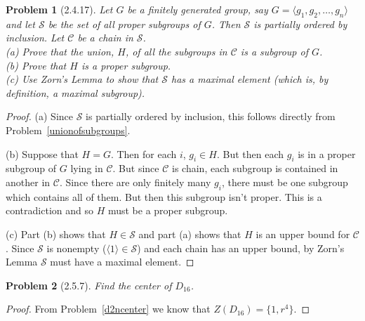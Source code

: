 \documentclass{article}
\newtheorem{problem}{Problem}
\begin{document}
\begin{problem}[2.4.17]
Let $G$ be a finitely generated group, say $G = \langle g_1, g_2, \dots , g_n \rangle$ and let $\mathcal{S}$ be the set of all proper subgroups of $G$. Then $\mathcal{S}$ is partially ordered by inclusion. Let $\mathcal{C}$ be a chain in $\mathcal{S}$.\\
(a) Prove that the union, $H$, of all the subgroups in $\mathcal{C}$ is a subgroup of $G$.\\
(b) Prove that $H$ is a \emph{proper} subgroup.\\
(c) Use Zorn's Lemma to show that $\mathcal{S}$ has a maximal element (which is, by definition, a maximal subgroup).
\end{problem}
\begin{proof}
(a) Since $\mathcal{S}$ is partially ordered by inclusion, this follows directly from Problem~\ref{unionofsubgroups}.

(b) Suppose that $H = G$. Then for each $i$, $g_i \in H$. But then each $g_i$ is in a proper subgroup of $G$ lying in $\mathcal{C}$. But since $\mathcal{C}$ is chain, each subgroup is contained in another in $\mathcal{C}$. Since there are only finitely many $g_i$, there must be one subgroup which contains all of them. But then this subgroup isn't proper. This is a contradiction and so $H$ must be a proper subgroup.

(c) Part (b) shows that $H \in \mathcal{S}$ and part (a) shows that $H$ is an upper bound for $\mathcal{C}$. Since $\mathcal{S}$ is nonempty ($\langle 1 \rangle \in \mathcal{S}$) and each chain has an upper bound, by Zorn's Lemma $\mathcal{S}$ must have a maximal element.
\end{proof}

\begin{problem}[2.5.7]
Find the center of $D_{16}$.
\end{problem}
\begin{proof}
From Problem~\ref{d2ncenter} we know that $Z(D_{16}) = \{1, r^4\}$.
\end{proof}
\end{document}
